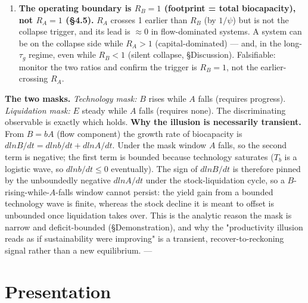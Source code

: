 \documentclass[11pt]{article}
\begin{document}
\begin{enumerate}
\item \textbf{The operating boundary is $R_{B} = 1$ (footprint = total biocapacity), not $R_{A} = 1$ (§4.5).} $R_{A}$ crosses 1 earlier than $R_{B}$ (by $1/\psi{}$) but is not the collapse trigger, and its lead is \ensuremath{\approx{}}0 in flow-dominated systems. A system can be on the collapse side while $R_{A} > 1$ (capital-dominated) — and, in the long-$\tau{}_{g}$ regime, even while $R_{B} < 1$ (silent collapse, §Discussion). Falsifiable: monitor the two ratios and confirm the trigger is $R_{B} = 1$, not the earlier-crossing $R_{A}$.
\end{enumerate}

\textbf{The two masks.} \emph{Technology mask:} $B$ rises while $A$ falls (requires progress). \emph{Liquidation mask:} $E$ steady while $A$ falls (requires none). The discriminating observable is exactly which holds. \textbf{Why the illusion is necessarily transient.} From $B = bA$ (flow component) the growth rate of biocapacity is $d ln B/dt = d ln b/dt + d ln A/dt$. Under the mask window $A$ falls, so the second term is negative; the first term is bounded because technology saturates ($T_{b}$ is a logistic wave, so $d ln b/dt \leq{} 0$ eventually). The sign of $d ln B/dt$ is therefore pinned by the unboundedly negative $d ln A/dt$ under the stock-liquidation cycle, so a $B$-rising-while-$A$-falls window cannot persist: the yield gain from a bounded technology wave is finite, whereas the stock decline it is meant to offset is unbounded once liquidation takes over. This is the analytic reason the mask is narrow and deficit-bounded (§Demonstration), and why the "productivity illusion reads as if sustainability were improving" is a transient, recover-to-reckoning signal rather than a new equilibrium. ---

\section{Presentation}
\end{document}
